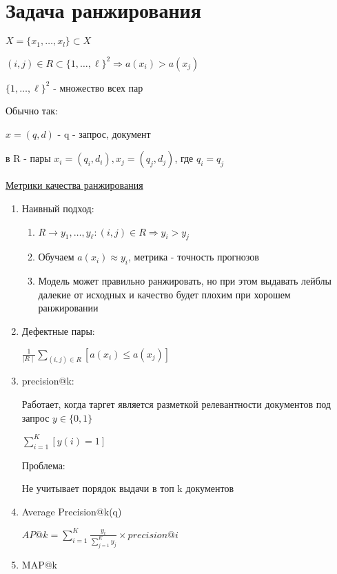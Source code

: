 \documentclass[a4paper, 12pt]{article}
\begin{document}
\section{Задача ранжирования}

\(X = \{x_1, \ldots, x_l\} \subset X\)

\((i, j) \in R \subset \{1, \ldots, \ell\}^2 \Rightarrow
a(x_i) > a(x_j)\)

$\{1, \ldots, \ell\}^2$ - множество всех пар

Обычно так:

\(x = (q, d)\) - q - запрос, документ

в R - пары $x_i = (q_i, d_i), x_j = (q_j, d_j)$, где $q_i = q_j$

\underline{Метрики качества ранжирования}

\begin{enumerate}
    \item Наивный подход:
    
    \begin{enumerate}
        \item \(R \rightarrow y_1, \ldots, y_{\ell}: 
        (i, j) \in R \Rightarrow y_i > y_j\)
        \item Обучаем $a(x_i) \approx y_i$, 
        метрика - точность прогнозов
        \item Модель может правильно ранжировать, но при этом
        выдавать лейблы далекие от исходных и качество будет 
        плохим при хорошем ранжировании
    \end{enumerate}
    
    \item Дефектные пары:
    
    \(\frac{1}{\mid R \mid}\sum_{(i, j) \in R}[a(x_i) \leq a(x_j)]\)
    
    \item precision@k:
    
    Работает, когда таргет является разметкой релевантности
    документов под запрос $y \in \{0, 1\}$

    \(\sum_{i = 1}^K[y(i) = 1]\)

    Проблема:

    Не учитывает порядок выдачи в топ k документов

    \item Average Precision@k(q)
    
    \(AP@k = \sum_{i = 1}^K \frac{y_i}{\sum_{j = 1}^K y_j} \times 
    precision@i\)

    \item MAP@k
    

\end{enumerate}
\end{document}
